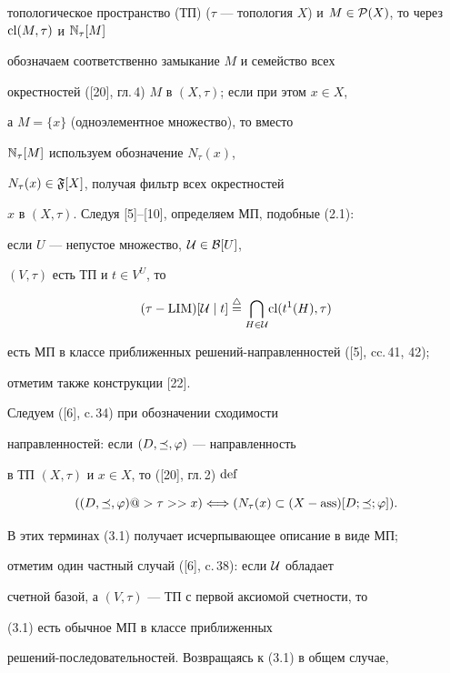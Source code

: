 топологическое пространство (ТП) ($\tau$ --- топология $X$) и $M \in


{{\cal P}(X)}$, то через ${\cl}(M,\tau)$ и ${{\Bbb N}_\tau}[M]$


обозначаем соответственно замыкание $M$ и семейство всех


окрестностей ([20], гл.\,4) $M$ в $(X,\tau)$; если при этом $x \in X$,


а $M = \{x\}$ (одноэлементное множество), то вместо


${{\Bbb N}_\tau}[M]$ используем обозначение ${N_\tau}(x)$,


${N_\tau}(x) \in {{\frak F}[X]}$, получая фильтр всех окрестностей


$x$ в $(X,\tau)$. Следуя [5]--[10], определяем МП, подобные (2.1):


если $U$ --- непустое множество, ${\cal U} \in {{\cal B}[U]}$,


$(V,\tau)$ есть ТП и $t \in {V^U}$, то


\begin{equation}


(\tau - {\LIM})[{\cal U} \mid t] \stac


{\bigcap\limits_{H \in {\cal U}}}{\cl}({t^1}(H),\tau)


\end{equation}


есть МП в классе приближенных решений-направленностей ([5], cc.\,41, 42);


отметим также конструкции [22].


Следуем ([6], c.\,34) при обозначении сходимости


направленностей: если $(D,\preceq,\varphi)$ --- направленность


в ТП $(X,\tau)$ и $x \in X$, то ([20], гл.\,2) $\operatorname{def}$


$$


((D,\preceq,\vp) @>{\tau}>> x) \Longleftrightarrow


({N_\tau}(x) \subset (X - {\ass})[D;\preceq;\vp]).


$$


В этих терминах (3.1) получает исчерпывающее описание в виде МП;


отметим один частный случай ([6], c.\,38): если ${\cal U}$ обладает


счетной базой, а $(V,\tau)$ --- ТП с первой аксиомой счетности, то


(3.1) есть обычное МП в классе приближенных


решений-последовательностей. Возвращаясь к (3.1) в общем случае,


